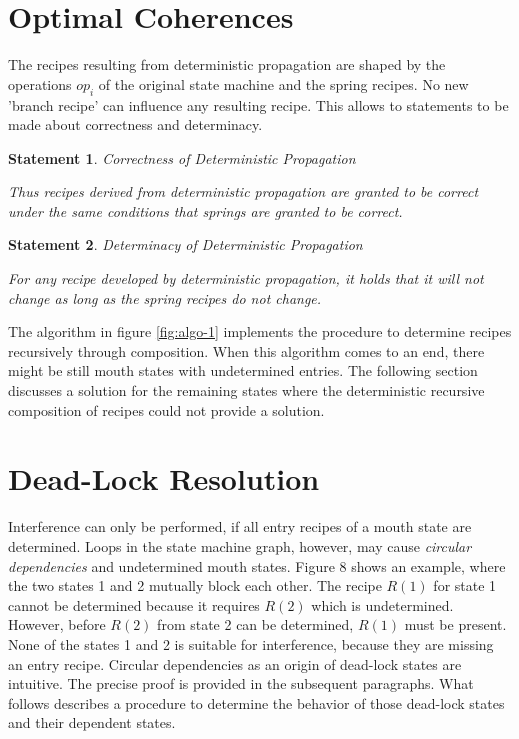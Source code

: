 \documentclass[12pt,a4paper]{scrartcl}
\newtheorem{statement}{Statement}
\begin{document}
\section{Optimal Coherences}

The recipes resulting from deterministic propagation are shaped by the 
operations $op_i$ of the original state machine and the spring recipes. No
new 'branch recipe' can influence any resulting recipe. This allows to 
statements to be made about correctness and determinacy.

\begin{statement} Correctness of Deterministic Propagation \label{stm:correctness-rule}
    
    Thus recipes derived from deterministic propagation are granted
    to be correct under the same conditions that springs are granted to be
    correct.

\end{statement}

\begin{statement} Determinacy of Deterministic Propagation \label{stm:determinacy-rule}

    For any recipe developed by deterministic propagation, it holds that it 
    will not change as long as the spring recipes do not change.

\end{statement}


The algorithm in figure \ref{fig:algo-1} implements the procedure to determine
recipes recursively through composition.  When this algorithm comes to an end,
there might be still mouth states with undetermined entries.  The following
section discusses a solution for the remaining states where the deterministic
recursive composition of recipes could not provide a solution.

%
\section{Dead-Lock Resolution}

Interference can only be performed, if all entry recipes of a mouth state are
determined. Loops in the state machine graph, however, may cause
\textit{circular dependencies} and undetermined mouth states.  Figure 8 shows
an example, where the two states 1 and 2 mutually block each other. The recipe
$R(1)$ for state 1 cannot be determined because it requires $R(2)$ which is
undetermined. However, before $R(2)$ from state 2 can be determined, $R(1)$
must be present. None of the states 1 and 2 is suitable for interference,
because they are missing an entry recipe.  Circular dependencies as an origin
of dead-lock states are intuitive. The precise proof is provided in the
subsequent paragraphs. What follows describes a procedure to determine the
behavior of those dead-lock states and their dependent states.
\end{document}
